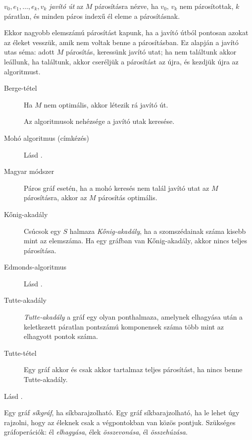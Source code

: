 \documentclass[%
	DIV=15,appendixprefix]{scrreprt}
\theoremstyle{definition}
\theoremstyle{remark}
\begin{document}
$ v_0,{} e_1,{} \ldots,{} e_k,{} v_k $ \emph{javító út} az $ M $ párosításra nézve, ha $ v_0 $,
$ v_k $ nem párosítottak, $k$ páratlan, és minden páros indexű él eleme a párosításnak.

Ekkor nagyobb elemszámú párosítást kapunk, ha a javító útból pontosan azokat az éleket vesszük, amik
nem voltak benne a párosításban. Ez alapján a javító utas séma: adott $ M $ párosítás, keressünk
javító utat; ha nem találtunk akkor leállunk, ha találtunk, akkor cseréljük a párosítást az újra,
és kezdjük újra az algoritmust.
\begin{description}
	\item[Berge-tétel] Ha $ M $ nem optimális, akkor létezik rá javító út.

		Az algoritmusok nehézsége a javító utak keresése.
	\item[Mohó algoritmus (címkézés)] Lásd
		\cite[\href{http://www.math.u-szeged.hu/~hajnal/courses/MSc_Diszkret/MSc_kombi13/ea-Edmonds%
		.pdf}{\emph{Párosítások II. -- Kombinatorikus módszerek}}, 2.~szakasz]{DiMat}.
	\item[Magyar módszer] Páros gráf esetén, ha a mohó keresés nem talál javító utat az $M$
		párosításra, akkor az $M$ párosítás optimális.
	\item[Kőnig-akadály] Csúcsok egy $S$ halmaza \emph{Kőnig-akadály}, ha a szomszédainak száma
		kisebb mint az elemszáma. Ha egy gráfban van Kőnig-akadály, akkor nincs teljes párosítása.
	\item[Edmonds-algoritmus] Lásd
		\cite[\href{http://www.math.u-szeged.hu/~hajnal/courses/MSc_Diszkret/MSc_kombi13/ea-Edmonds%
		.pdf}{\emph{Párosítások II. -- Kombinatorikus módszerek}}, 3.~szakasz]{DiMat}.
	\item[Tutte-akadály] \emph{Tutte-akadály} a gráf egy olyan ponthalmaza, amelynek elhagyása után
		a keletkezett páratlan pontszámú komponensek száma több mint az elhagyott pontok száma.
	\item[Tutte-tétel]  Egy gráf akkor és csak akkor tartalmaz teljes párosítást, ha nincs benne
		Tutte-akadály.
\end{description}
%
Lásd
\cite[\href{http://www.math.u-szeged.hu/~hajnal/courses/MSc_Diszkret/MSc_kombi13/ea-Wagner.pdf}
{\emph{Síkgráfok I. -- Wagner-tétel}}]{DiMat}.

Egy gráf \emph{síkgráf}, ha síkbarajzolható. Egy gráf síkbarajzolható, ha le lehet úgy rajzolni,
hogy az éleknek csak a végpontokban van közös pontjuk. Szükséges gráfoperációk: él \emph{elhagyása},
élek \emph{összevonása}, él \emph{összehúzása}.
\end{document}
